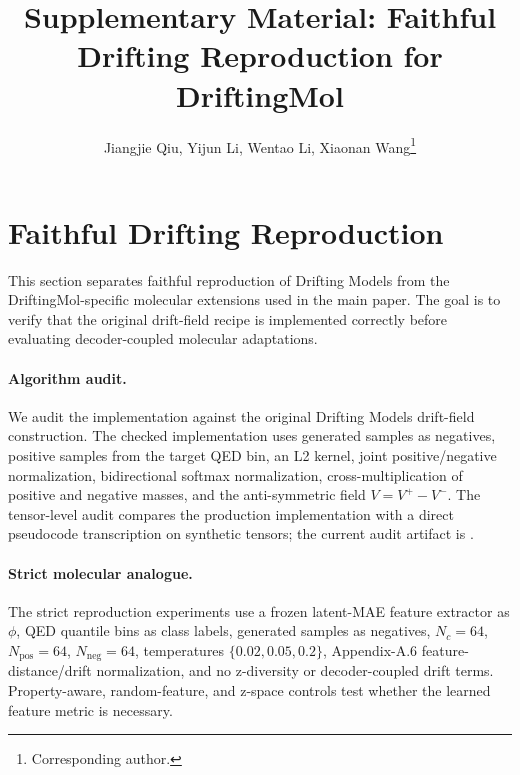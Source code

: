 \documentclass[letterpaper]{article}
\title{Supplementary Material: Faithful Drifting Reproduction for DriftingMol}
\author{Jiangjie Qiu, Yijun Li, Wentao Li, Xiaonan Wang\thanks{Corresponding author.}}
\begin{document}
\maketitle


\section{Faithful Drifting Reproduction}
\label{sec:supp-faithful-drifting}

This section separates faithful reproduction of Drifting Models from the
DriftingMol-specific molecular extensions used in the main paper. The goal is
to verify that the original drift-field recipe is implemented correctly before
evaluating decoder-coupled molecular adaptations.

\paragraph{Algorithm audit.}
We audit the implementation against the original Drifting Models drift-field
construction. The checked implementation uses generated samples as negatives,
positive samples from the target QED bin, an L2 kernel, joint positive/negative
normalization, bidirectional softmax normalization, cross-multiplication of
positive and negative masses, and the anti-symmetric field $V = V^+ - V^-$.
The tensor-level audit compares the production implementation with a direct
pseudocode transcription on synthetic tensors; the current audit artifact is
.

\paragraph{Strict molecular analogue.}
The strict reproduction experiments use a frozen latent-MAE feature extractor
as $\phi$, QED quantile bins as class labels, generated samples as negatives,
$N_c=64$, $N_{\mathrm{pos}}=64$, $N_{\mathrm{neg}}=64$, temperatures
$\{0.02,0.05,0.2\}$, Appendix-A.6 feature-distance/drift normalization, and
no z-diversity or decoder-coupled drift terms. Property-aware, random-feature,
and z-space controls test whether the learned feature metric is necessary.
\end{document}
